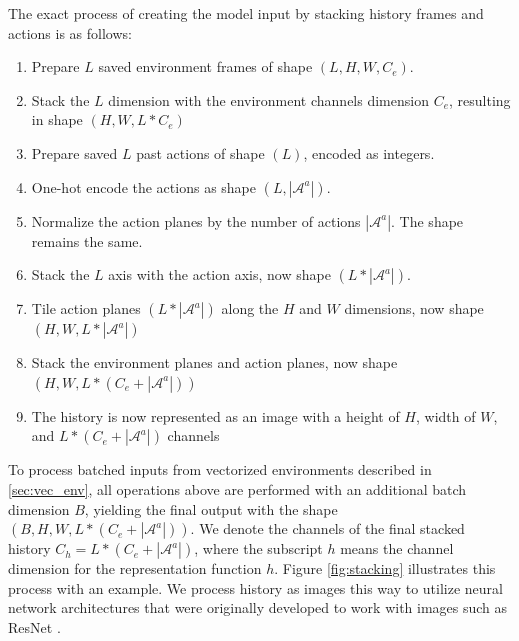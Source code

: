 The exact process of creating the model input by stacking history frames and actions is as follows:
\begin{enumerate}
    \item Prepare $L$ saved environment frames of shape $(L, H, W, C_e)$.
    \item Stack the $L$ dimension with the environment channels dimension $C_e$, resulting in shape $(H, W, L * C_e)$
    \item Prepare saved $L$ past actions of shape $(L)$, encoded as integers.
    \item One-hot encode the actions as shape $(L, |\mathcal{A}^a|)$.
    \item Normalize the action planes by the number of actions $|\mathcal{A}^a|$. The shape remains the same.
    \item Stack the $L$ axis with the action axis, now shape $(L * |\mathcal{A}^a|)$.
    \item Tile action planes $(L * |\mathcal{A}^a|)$ along the $H$ and $W$ dimensions, now shape $(H, W, L * |\mathcal{A}^a|)$
    \item Stack the environment planes and action planes, now shape $(H, W, L * (C_e + |\mathcal{A}^a|))$
    \item The history is now represented as an image with a height of $H$, width of $W$, and $L * (C_e + |\mathcal{A}^a|)$ channels
\end{enumerate}

To process batched inputs from vectorized environments described in \ref{sec:vec_env}, all operations above are performed with an additional batch dimension $B$, yielding the final output with the shape $(B, H, W, L * (C_e + |\mathcal{A}^a|))$.
We denote the channels of the final stacked history $C_h = L * (C_e + |\mathcal{A}^a|)$, where the subscript $h$ means the channel dimension for the representation function $h$.
Figure \ref{fig:stacking} illustrates this process with an example.
We process history as images this way to utilize neural network architectures that were originally developed to work with images such as ResNet \cite{DeepResidualLearning_He.Zhang.ea_2016}.

